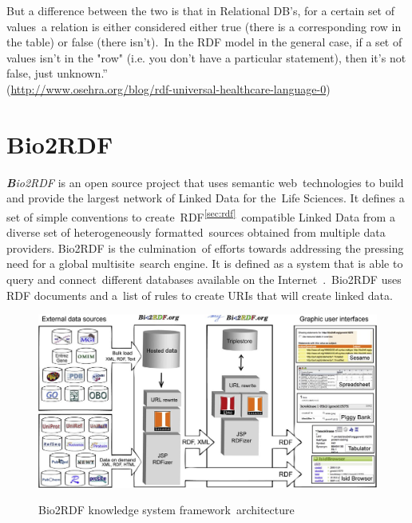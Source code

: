 \documentclass[DIV=calc, paper=a4, fontsize=12pt, onecolumn]{scrartcl}	 %
\newcommand{\initial}[1]{ %
\lettrine[lines=3,lhang=0.3,nindent=0em,slope=0em]{
\color{DarkBlue}
{\textbf{\textit{#1}}}}{}}
\begin{document}
But a difference between the two is that in Relational DB's, for a certain set of values\
a relation is either considered either true (there is a corresponding row in the table) or false (there isn't).\
 In the RDF model in the general case, if a set of values isn't in the "row" (i.e. you don't have a particular statement), then it's not false, just unknown.”\\

 (\url{http://www.osehra.org/blog/rdf-universal-healthcare-language-0})\\

  \section{Bio2RDF}
  \label{sec:bio2rdf}
  
  \initial{B}\textit{io2RDF} is an open source project that uses semantic web\
  technologies to build and provide the largest network of Linked Data for the\
  Life Sciences. It defines a set of simple conventions to create\
  RDF\textsuperscript{\ref{sec:rdf}}\
  compatible Linked Data from a diverse set of heterogeneously formatted\
  sources obtained from multiple data providers. Bio2RDF is the culmination\
  of efforts towards addressing the pressing need for a global multisite\
  search engine. It is defined as a system that is able to query and connect\
  different databases available on the Internet~\cite{belleau_bio2rdf:_2008}.\
  Bio2RDF uses RDF documents and a\
  list of rules to create URIs that will create linked data.\\
  
  \begin{figure}[ht!]
    \centering
    \includegraphics[scale=0.30]{bio2rdf_architecture.jpg}
    \caption{Bio2RDF knowledge system framework\
    architecture}\cite[Fig.~1]{belleau_bio2rdf:_2008}
    \label{fig:bio2rdf_architecture}
  \end{figure}  
\end{document}
